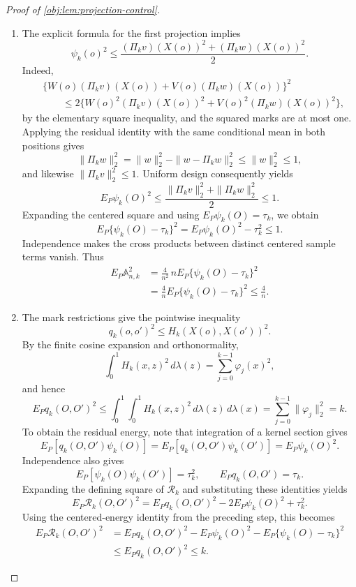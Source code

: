 \begin{proof}[Proof of \cref{obj:lem:projection-control}]
\begin{enumerate}
\item The explicit formula for the first projection implies
\[
\psi_k(o)^2
\le\frac{(\Pi_kv)(X(o))^2+(\Pi_kw)(X(o))^2}{2}.
\]
Indeed,
\[
\begin{aligned}
&\{W(o)(\Pi_kv)(X(o))+V(o)(\Pi_kw)(X(o))\}^2\\
&\qquad\le2\{W(o)^2(\Pi_kv)(X(o))^2
             +V(o)^2(\Pi_kw)(X(o))^2\},
\end{aligned}
\]
by the elementary square inequality, and the squared marks are at most one. Applying the residual identity with the same conditional mean in both positions gives
\[
\|\Pi_kw\|_2^2
=\|w\|_2^2-\|w-\Pi_kw\|_2^2
\le\|w\|_2^2\le1,
\]
and likewise \(\|\Pi_kv\|_2^2\le1\). Uniform design consequently yields
\[
E_P\psi_k(O)^2
\le\frac{\|\Pi_kv\|_2^2+\|\Pi_kw\|_2^2}{2}\le1.
\]
Expanding the centered square and using \(E_P\psi_k(O)=\tau_k\), we obtain
\[
E_P\{\psi_k(O)-\tau_k\}^2
=E_P\psi_k(O)^2-\tau_k^2\le1.
\]
Independence makes the cross products between distinct centered sample terms vanish. Thus
\[
\begin{aligned}
E_P\mathbb A_{n,k}^2
&=\frac4{n^2}\,
 nE_P\{\psi_k(O)-\tau_k\}^2\\
&=\frac4nE_P\{\psi_k(O)-\tau_k\}^2
\le\frac4n.
\end{aligned}
\]

\item The mark restrictions give the pointwise inequality
\[
q_k(o,o')^2\le H_k(X(o),X(o'))^2.
\]
By the finite cosine expansion and orthonormality,
\[
\int_0^1 H_k(x,z)^2\,d\lambda(z)
=\sum_{j=0}^{k-1}\varphi_j(x)^2,
\]
and hence
\[
E_Pq_k(O,O')^2
\le\int_0^1\!\int_0^1H_k(x,z)^2\,d\lambda(z)\,d\lambda(x)
=\sum_{j=0}^{k-1}\|\varphi_j\|_2^2=k.
\]
To obtain the residual energy, note that integration of a kernel section gives
\[
E_P[q_k(O,O')\psi_k(O)]
=E_P[q_k(O,O')\psi_k(O')]
=E_P\psi_k(O)^2.
\]
Independence also gives
\[
E_P[\psi_k(O)\psi_k(O')]=\tau_k^2,
\qquad
E_Pq_k(O,O')=\tau_k.
\]
Expanding the defining square of \(\mathcal R_k\) and substituting these identities yields
\[
E_P\mathcal R_k(O,O')^2
=E_Pq_k(O,O')^2-2E_P\psi_k(O)^2+\tau_k^2.
\]
Using the centered-energy identity from the preceding step, this becomes
\[
\begin{aligned}
E_P\mathcal R_k(O,O')^2
&=E_Pq_k(O,O')^2-E_P\psi_k(O)^2
  -E_P\{\psi_k(O)-\tau_k\}^2\\
&\le E_Pq_k(O,O')^2\le k.
\end{aligned}
\]


\end{enumerate}
\end{proof}
